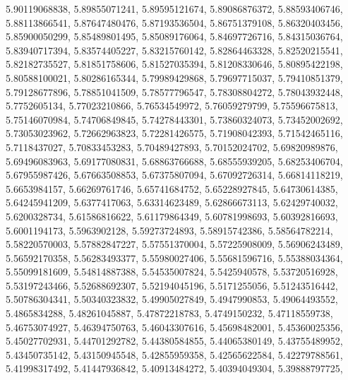 \begin{code}
\begin{hide}
{     5.90119068838,     5.89855071241,     5.89595121674,
     5.89086876372,     5.88593406746,     5.88113866541,
     5.87647480476,     5.87193536504,     5.86751379108,
     5.86320403456,     5.85900050299,     5.85489801495,
     5.85089176064,     5.84697726716,     5.84315036764,
     5.83940717394,     5.83574405227,     5.83215760142,
     5.82864463328,     5.82520215541,     5.82182735527,
     5.81851758606,     5.81527035394,     5.81208330646,
     5.80895422198,     5.80588100021,     5.80286165344,
     5.79989429868,     5.79697715037,     5.79410851379,
     5.79128677896,     5.78851041509,     5.78577796547,
     5.78308804272,     5.78043932448,      5.7752605134,
     5.77023210866,     5.76534549972,     5.76059279799,
     5.75596675813,     5.75146070984,     5.74706849845,
     5.74278443301,     5.73860324073,     5.73452002692,
     5.73053023962,     5.72662963823,     5.72281426575,
     5.71908042393,     5.71542465116,      5.7118437027,
     5.70833453283,     5.70489427893,     5.70152024702,
     5.69820989876,     5.69496083963,     5.69177080831,
     5.68863766688,     5.68555939205,     5.68253406704,
     5.67955987426,     5.67663508853,     5.67375807094,
     5.67092726314,     5.66814118219,      5.6653984157,
     5.66269761746,     5.65741684752,     5.65228927845,
     5.64730614385,     5.64245941209,      5.6377417063,
     5.63314623489,     5.62866673113,     5.62429740032,
      5.6200328734,     5.61586816622,     5.61179864349,
     5.60781998693,     5.60392816693,      5.6001194173,
      5.5963902128,     5.59273724893,     5.58915742386,
     5.58564782214,     5.58220570003,     5.57882847227,
     5.57551370004,     5.57225908009,     5.56906243489,
     5.56592170358,     5.56283493377,     5.55980027406,
     5.55681596716,     5.55388034364,     5.55099181609,
     5.54814887388,     5.54535007824,      5.5425940578,
     5.53720516928,     5.53197243466,     5.52688692307,
     5.52194045196,      5.5171255056,     5.51243516442,
     5.50786304341,     5.50340323832,     5.49905027849,
      5.4947990853,     5.49064493552,      5.4865834288,
     5.48261045887,     5.47872218783,      5.4749150232,
     5.47118559738,     5.46753074927,     5.46394750763,
     5.46043307616,     5.45698482001,     5.45360025356,
     5.45027702931,     5.44701292782,     5.44380584855,
     5.44065380149,     5.43755489952,     5.43450735142,
     5.43150945548,     5.42855959358,     5.42565622584,
     5.42279788561,     5.41998317492,     5.41447936842,
     5.40913484272,     5.40394049304,     5.39888797725,
}
\end{hide}
\end{code}
